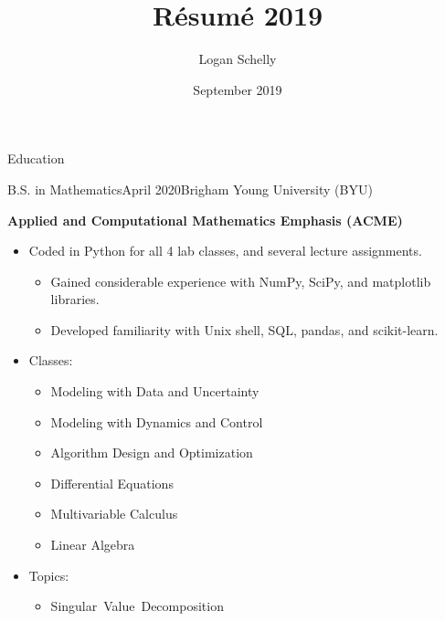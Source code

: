 \documentclass{resume}
\title{R\'esum\'e 2019}
\author{Logan Schelly}
\date{September 2019}
\begin{document}
\begin{rSection}{Education}
    \begin{rSubsection}
    {B.S. in Mathematics}{April 2020}{Brigham Young University (BYU)}{}
    \vspace{2pt}
        \item \textbf{Applied and Computational Mathematics Emphasis (ACME)}
            \begin{itemize}[label = \vspace{0ex}, itemsep = -5pt, topsep=-3pt]
                \item Coded in Python for all 4 lab classes, and several lecture assignments.
                    \begin{itemize}[noitemsep, topsep=-6pt, label = $\cdot$]
                        \item Gained considerable experience with NumPy, SciPy, and matplotlib libraries.
                        \item Developed familiarity with Unix shell, SQL, pandas, and scikit-learn.
                    \end{itemize}
                \item Classes:\noindent
                    \begin{multicols}{2}
                    \begin{itemize}[label = $\cdot$, noitemsep, topsep=0pt]
                        \item Modeling with Data and Uncertainty
                        \item Modeling with Dynamics and Control
                        \item Algorithm Design and Optimization
                        \item Differential Equations
                        \item Multivariable Calculus
                        \item Linear Algebra
                    \end{itemize}
                    \end{multicols}
                \item Topics:\noindent
                \begin{multicols}{3}
                \begin{itemize}[noitemsep, topsep=0pt, label = $\cdot$]
                    \item \mbox{Singular Value Decomposition}

\end{itemize}
\end{multicols}
\end{itemize}
\end{rSubsection}
\end{rSection}
\end{document}

